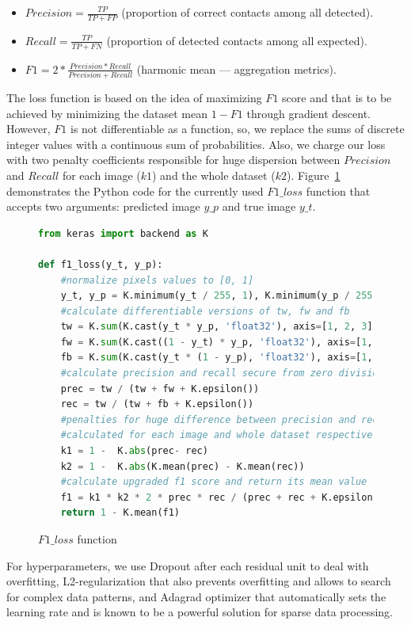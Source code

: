 \begin{itemize} 
    \item $Precision = \displaystyle \frac{TP}{TP + FP}$ (proportion of correct contacts among all detected).
    \item $Recall = \displaystyle \frac{TP}{TP + FN}$ (proportion of detected contacts among all expected).
    \item $F1 = \displaystyle 2 * \frac{Precision * Recall}{Precision + Recall}$ (harmonic mean --- aggregation metrics).
\end{itemize}

The loss function is based on the idea of maximizing $F1$ score and that is to be achieved by minimizing the dataset mean $1 - F1$ through gradient descent. However, $F1$ is not differentiable as a function, so, we replace the sums of discrete integer values with a continuous sum of probabilities. Also, we charge our loss with two penalty coefficients responsible for huge dispersion between $Precision$ and $Recall$ for each image ($k1$) and the whole dataset ($k2$). Figure~\ref{loss} demonstrates the Python code for the currently used  $F1\_loss$ function that accepts two arguments: predicted image $y\_p$ and true image $y\_t$.

\begin{figure}[h]
\centering
\begin{lstlisting}[language=Python]
from keras import backend as K

def f1_loss(y_t, y_p):
    #normalize pixels values to [0, 1]
    y_t, y_p = K.minimum(y_t / 255, 1), K.minimum(y_p / 255, 1)
    #calculate differentiable versions of tw, fw and fb
    tw = K.sum(K.cast(y_t * y_p, 'float32'), axis=[1, 2, 3])
    fw = K.sum(K.cast((1 - y_t) * y_p, 'float32'), axis=[1, 2, 3])
    fb = K.sum(K.cast(y_t * (1 - y_p), 'float32'), axis=[1, 2, 3])
    #calculate precision and recall secure from zero division error
    prec = tw / (tw + fw + K.epsilon())
    rec = tw / (tw + fb + K.epsilon())
    #penalties for huge difference between precision and recall 
    #calculated for each image and whole dataset respectively
    k1 = 1 -  K.abs(prec- rec)
    k2 = 1 -  K.abs(K.mean(prec) - K.mean(rec))
    #calculate upgraded f1 score and return its mean value
    f1 = k1 * k2 * 2 * prec * rec / (prec + rec + K.epsilon()) 
    return 1 - K.mean(f1)
\end{lstlisting}
\caption{$F1\_loss$ function}
\label{loss}
\end{figure} 

For hyperparameters, we use Dropout after each residual unit to deal with overfitting, L2-regularization that also prevents overfitting and allows to search for complex data patterns, and Adagrad optimizer that automatically sets the learning rate and is known to be a powerful solution for sparse data processing.

